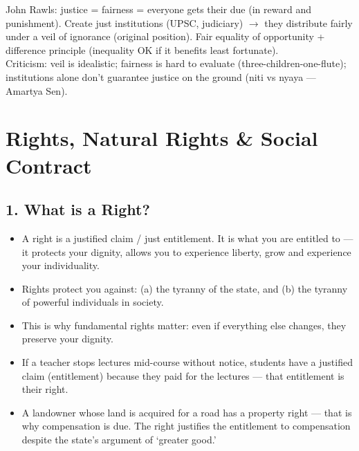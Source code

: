 \begin{QuickRevision}
John Rawls: justice = fairness = everyone gets their due (in reward and punishment). Create just institutions (UPSC, judiciary) $\rightarrow$ they distribute fairly under a veil of ignorance (original position). Fair equality of opportunity + difference principle (inequality OK if it benefits least fortunate).\\
Criticism: veil is idealistic; fairness is hard to evaluate (three-children-one-flute); institutions alone don't guarantee justice on the ground (niti vs nyaya --- Amartya Sen).
\end{QuickRevision}

\section{Rights, Natural Rights \& Social Contract}

\subsection*{1. What is a Right?}
\begin{KeyConcept}
\begin{itemize}
\item A right is a justified claim / just entitlement. It is what you are entitled to --- it protects your dignity, allows you to experience liberty, grow and experience your individuality.
\item Rights protect you against: (a) the tyranny of the state, and (b) the tyranny of powerful individuals in society.
\item This is why fundamental rights matter: even if everything else changes, they preserve your dignity.
\end{itemize}
\end{KeyConcept}

\begin{ExampleBox}
\begin{itemize}
\item If a teacher stops lectures mid-course without notice, students have a justified claim (entitlement) because they paid for the lectures --- that entitlement is their right.
\item A landowner whose land is acquired for a road has a property right --- that is why compensation is due. The right justifies the entitlement to compensation despite the state's argument of `greater good.'
\end{itemize}
\end{ExampleBox}

